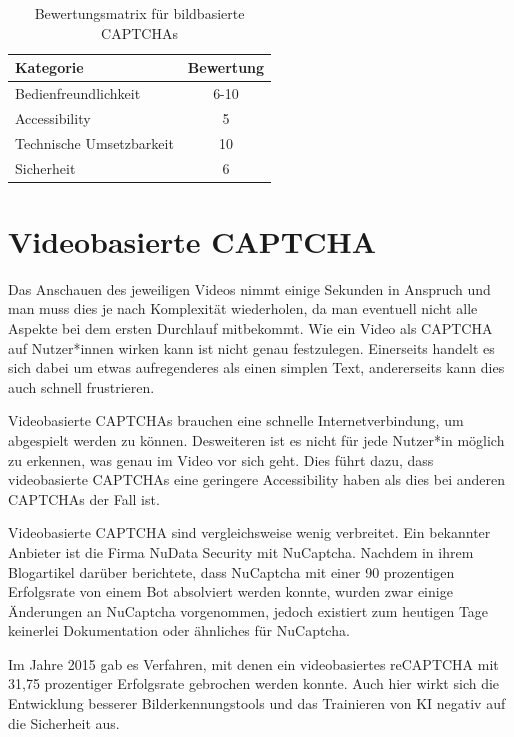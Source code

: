 \begin{table}[h!]
    \caption{Bewertungsmatrix für bildbasierte CAPTCHAs}
    \begin{center}
        \begin{tabular}{l|c}
            Kategorie                       & Bewertung \\\hline
            Bedienfreundlichkeit            & 6-10         \\
            Accessibility                   & 5        \\
            Technische Umsetzbarkeit        & 10         \\
            Sicherheit                      & 6         
        \end{tabular}
    \end{center}
    \label{table:matrix:bild}
\end{table}

\section{Videobasierte CAPTCHA}
Das Anschauen des jeweiligen Videos nimmt einige Sekunden in Anspruch und man muss dies je nach Komplexität wiederholen, 
da man eventuell nicht alle Aspekte bei dem ersten Durchlauf mitbekommt.
Wie ein Video als CAPTCHA auf Nutzer*innen wirken kann ist nicht genau festzulegen.
Einerseits handelt es sich dabei um etwas aufregenderes als einen simplen Text, andererseits kann dies auch schnell frustrieren.

Videobasierte CAPTCHAs brauchen eine schnelle Internetverbindung, um abgespielt werden zu können. 
Desweiteren ist es nicht für jede Nutzer*in möglich zu erkennen, was genau im Video vor sich geht.
Dies führt dazu, dass videobasierte CAPTCHAs eine geringere Accessibility haben als dies bei anderen CAPTCHAs der Fall ist. 

Videobasierte CAPTCHA sind vergleichsweise wenig verbreitet. 
Ein bekannter Anbieter ist die Firma NuData Security mit NuCaptcha.
Nachdem \citeauthor{elie} in ihrem Blogartikel  darüber berichtete, 
dass NuCaptcha mit einer 90 prozentigen Erfolgsrate von einem Bot absolviert werden konnte,
wurden zwar einige Änderungen an NuCaptcha vorgenommen, jedoch existiert zum heutigen Tage keinerlei Dokumentation oder ähnliches für NuCaptcha.

Im Jahre 2015 gab es Verfahren, mit denen ein videobasiertes reCAPTCHA mit 31,75 prozentiger Erfolgsrate gebrochen werden konnte. 
Auch hier wirkt sich die Entwicklung besserer Bilderkennungstools und das Trainieren von KI negativ auf die Sicherheit aus.\cite[p.xx]{surveyofresearch}

